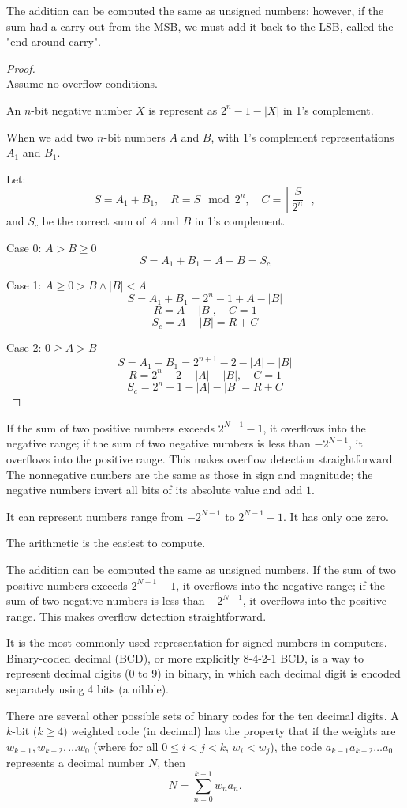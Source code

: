 \documentclass[a4paper,12pt]{report}
\begin{document}
The addition can be computed the same as unsigned numbers; however, if the sum had a carry out from the MSB, we must add it back to the LSB, called the "end-around carry".
\begin{proof}\mbox{}\\
Assume no overflow conditions.

An $n$-bit negative number $X$ is represent as $2^n-1-|X|$ in 1’s complement.

When we add two $n$-bit numbers $A$ and $B$, with 1’s complement representations $A_1$ and $B_1$.

Let:
\[S = A_1 + B_1,\quad R=S \mod 2^n, \quad C=\left\lfloor \frac{S}{2^n} \right\rfloor,\]
and $S_c$ be the correct sum of $A$ and $B$ in 1’s complement.

Case 0: $A>B\geq 0$
\[S = A_1 + B_1 = A +B =S_c\]

Case 1: $A\geq 0>B\land |B|<A$
\[S = A_1 + B_1 = 2^n-1+A-|B|\]
\[R=A-|B|,\quad C=1\]
\[S_c=A-|B|=R+C\]

Case 2: $0\geq A>B$
\[S=A_1+B_1=2^{n+1}-2-|A|-|B|\]
\[R=2^n-2-|A|-|B|,\quad C=1\]
\[S_c=2^n-1-|A|-|B|=R+C\]
\end{proof}

If the sum of two positive numbers exceeds $2^{N-1}-1$, it overflows into the negative range; if the sum of two negative numbers is less than $-2^{N-1}$, it overflows into the positive range. This makes overflow detection straightforward. 
The nonnegative numbers are the same as those in sign and magnitude; the negative numbers invert all bits of its absolute value and add $1$. 

It can represent numbers range from $-2^{N-1}$ to $2^{N-1}-1$. It has only one zero.

The arithmetic is the easiest to compute.

The addition can be computed the same as unsigned numbers. If the sum of two positive numbers exceeds $2^{N-1}-1$, it overflows into the negative range; if the sum of two negative numbers is less than $-2^{N-1}$, it overflows into the positive range. This makes overflow detection straightforward. 

It is the most commonly used representation for signed numbers in computers.
Binary-coded decimal (BCD), or more explicitly 8-4-2-1 BCD, is a way to represent decimal digits ($0$ to $9$) in binary, in which each decimal digit is encoded separately using 4 bits (a nibble).

There are several other possible sets of binary codes for the ten decimal digits. A $k$-bit ($k\geq 4$) weighted code (in decimal) has the property that if the weights are $w_{k-1}, w_{k-2}, \ldots w_0$ (where for all $0\leq i<j<k$, $w_i<w_j$), the code $a_{k-1}a_{k-2}\ldots a_0$ represents a decimal number $N$, then
\[N = \sum_{n=0}^{k-1}w_na_n.\]
\end{document}
